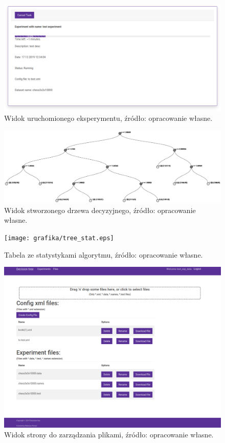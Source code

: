 \begin{figure}[htb]
	\centering
	\includegraphics[width=15cm]{grafika/progress_bar.eps}
	\caption{Widok uruchomionego eksperymentu, źródło: opracowanie własne.}
	\label{rys15_progress_bar}
\end{figure}

\begin{figure}[htb]
	\centering
	\includegraphics[width=17cm]{grafika/tree_veiw.eps}
	\caption{Widok stworzonego drzewa decyzyjnego, źródło: opracowanie własne.}
	\label{rys16_tree_veiw}
\end{figure}

\begin{figure}[htb]
	\centering
	\texttt{[image: grafika/tree\_stat.eps]}
	\caption{Tabela ze statystykami algorytmu, źródło: opracowanie własne.}
	\label{rys22_tree_stat}
\end{figure}

\begin{figure}[htb]
	\centering
	\includegraphics[width=15cm]{grafika/file_page.eps}
	\caption{Widok strony do zarządzania plikami, źródło: opracowanie własne.}
	\label{rys17_file_page}
\end{figure}

